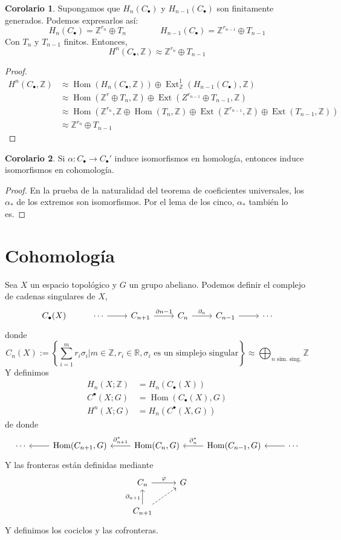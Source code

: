 \documentclass[spanish]{book}
\theoremstyle{definition}
\newtheorem*{coro}{Corolario}
\newcommand{\R}{\mathbb{R}}
\newcommand{\Z}{\mathbb{Z}}
\DeclareMathOperator{\Hom}{Hom}
\DeclareMathOperator{\Ext}{Ext}
\begin{document}
\begin{coro}
	Supongamos que $H_n(C_\bullet)$ y $H_{n-1}(C_\bullet)$ son finitamente generados. Podemos expresarlos así:
	\[H_n(C_\bullet)=\Z^{r_n}\oplus T_n\qquad\qquad H_{n-1}(C_\bullet)=\Z^{r_{n-1}}\oplus T_{n-1}\]
	Con $T_n$ y $T_{n-1}$ finitos. Entonces,
	\[H^n(C_\bullet,\Z)\approx\Z^{r_n}\oplus T_{n-1}\]
\end{coro}
\begin{proof}
	\begin{align*}
		H^n(C_\bullet,\Z)&\approx\Hom(H_n(C_\bullet,\Z))\oplus\Ext_\Z^1(H_{n-1}(C_\bullet),\Z)\\
		&\approx\Hom(\Z^r\oplus T_n,\Z)\oplus\Ext(Z^{r_{n-1}}\oplus T_{n-1},\Z)\\
		&\approx\Hom(\Z^{r_n},\Z\oplus\Hom(T_n,\Z)\oplus\Ext(\Z^{r_{n-1}},\Z)\oplus\Ext(T_{n-1},\Z))\\
		&\approx \Z^{r_n}\oplus T_{n-1}
	\end{align*}
\end{proof}
\begin{coro}
	Si $\alpha:C_\bullet\to C_\bullet'$ induce isomorfismos en homología, entonces induce isomorfismos en cohomología.
\end{coro}
\begin{proof}
	En la prueba de la naturalidad del teorema de coeficientes universales, los $\alpha_*$ de los extremos son isomorfismos. Por el lema de los cinco, $\alpha_*$ también lo es.
\end{proof}

\chapter{Cohomología}
Sea $X$ un espacio topológico y $G$ un grupo abeliano. Podemos definir el complejo de cadenas singulares de $X$,
\[\begin{tikzcd}
	C_\bullet(X)&\cdots\arrow[r]&C_{n+1}\arrow[r,"\partial{n-1}"]&C_n\arrow[r,"\partial_n"]&C_{n-1}\arrow[r]&\cdots
\end{tikzcd}\]
donde 
	\[C_n(X):=\left\{\sum_{i=1}^mr_i\sigma_i|m\in\Z,r_i\in\R,\sigma_i\text{ es un simplejo singular}\right\}\approx\bigoplus_{n\text{ sim. sing.}}\Z\]
Y definimos
\begin{align*}
	H_n(X;\Z)&=H_n(C_\bullet(X))\\
	C^\bullet(X;G)&=\Hom(C_\bullet(X),G)\\
	H^n(X;G)&=H_n(C^\bullet(X,G))
\end{align*}
de donde
\[\begin{tikzcd}
	\cdots&\Hom(C_{n+1},G)\arrow[l]&\Hom(C_n,G)\arrow[l,swap,"\partial_{n+1}^*"]&\Hom(C_{n-1},G)\arrow[l,swap,"\partial_n^*"]&\cdots\arrow[l]
\end{tikzcd}\]
Y las fronteras están definidas mediante
\[\begin{tikzcd}
	C_n\arrow[r,"\varphi"]&G\\
	C_{n+1}\arrow[u,"\partial_{n+1}"]\arrow[ur,dashed]
\end{tikzcd}\]
Y definimos los cociclos y las cofronteras.
\end{document}
